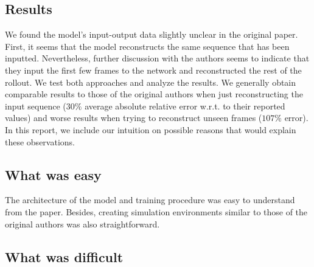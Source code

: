 \documentclass{article}
\begin{document}
\subsection*{Results}

We found the model's input-output data slightly unclear in the original paper.
First, it seems that the model reconstructs the same sequence that has been inputted.
Nevertheless, further discussion with the authors seems to indicate that they input the first few frames to the network and reconstructed the rest of the rollout.
We test both approaches and analyze the results.
We generally obtain comparable results to those of the original authors when just reconstructing the input sequence ($30\%$ average absolute relative error w.r.t. to their reported values) and worse results when trying to reconstruct unseen frames ($107\%$ error).
In this report, we include our intuition on possible reasons that would explain these observations.


\subsection*{What was easy}

The architecture of the model and training procedure was easy to understand from the paper.
Besides, creating simulation environments similar to those of the original authors was also straightforward. 

\subsection*{What was difficult}
\end{document}
